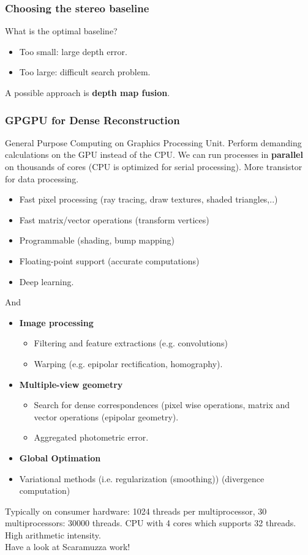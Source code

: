 \documentclass[a4paper,12 pt]{article}
\theoremstyle{definition}
\theoremstyle{remark}
\theoremstyle{definition}
\theoremstyle{definition}
\theoremstyle{definition}
\theoremstyle{remark}
\theoremstyle{definition}
\begin{document}
\subsubsection*{Choosing the stereo baseline}
What is the optimal baseline?
\begin{itemize}
\item Too small: large depth error.
\item Too large: difficult search problem.
\end{itemize}
A possible approach is \textbf{depth map fusion}.
\subsubsection*{GPGPU for Dense Reconstruction}
General Purpose Computing on Graphics Processing Unit. Perform demanding calculations on the GPU instead of the CPU. We can run processes in \textbf{parallel} on thousands of cores (CPU is optimized for serial processing). More transistor for data processing.
\begin{itemize}
\item Fast pixel processing (ray tracing, draw textures, shaded triangles,..)
\item Fast matrix/vector operations (transform vertices)
\item Programmable (shading, bump mapping)
\item Floating-point support (accurate computations)
\item Deep learning.
\end{itemize}
And
\begin{itemize}
\item \textbf{Image processing}
\begin{itemize}
\item Filtering and feature extractions (e.g. convolutions)
\item Warping (e.g. epipolar rectification, homography).
\end{itemize}
\item \textbf{Multiple-view geometry}
\begin{itemize}
\item Search for dense correspondences (pixel wise operations, matrix and vector operations (epipolar geometry).
\item Aggregated photometric error.
\end{itemize}
\item \textbf{Global Optimation}
\item Variational methods (i.e. regularization (smoothing)) (divergence computation)
\end{itemize}
Typically on consumer hardware: 1024 threads per multiprocessor, 30 multiprocessors: 30000 threads. CPU with 4 cores which supports 32 threads. High arithmetic intensity.\\
Have a look at Scaramuzza work!
\newpage
\end{document}
